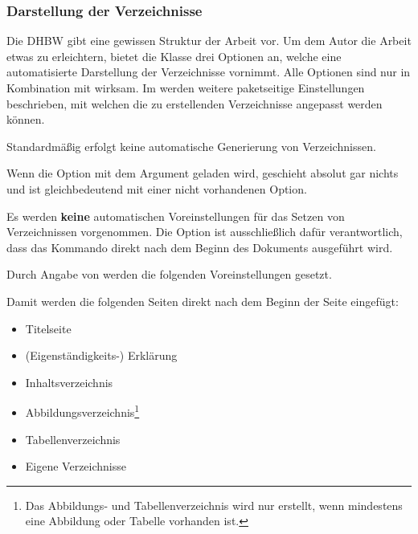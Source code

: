 \documentclass[babel=ngerman,highlight=false]{skdoc}
\begin{document}
            \subsubsection{Darstellung der Verzeichnisse}
                Die DHBW gibt eine gewissen Struktur der Arbeit vor. Um dem Autor die Arbeit etwas zu erleichtern, bietet die Klasse drei Optionen an, welche eine automatisierte Darstellung der Verzeichnisse vornimmt. Alle Optionen sind nur in Kombination mit  wirksam. Im  werden weitere paketseitige Einstellungen beschrieben, mit welchen die zu erstellenden Verzeichnisse angepasst werden können.\medskip

                Standardmäßig erfolgt keine automatische Generierung von Verzeichnissen.

                Wenn die Option mit dem Argument  geladen wird, geschieht absolut gar nichts und ist gleichbedeutend mit einer nicht vorhandenen Option.

                Es werden \textbf{keine} automatischen Voreinstellungen für das Setzen von Verzeichnissen vorgenommen. Die Option ist ausschließlich dafür verantwortlich, dass das Kommando \Macro\dhbwprintintro direkt nach dem Beginn des Dokuments ausgeführt wird.\medskip

                Durch Angabe von  werden die folgenden Voreinstellungen gesetzt.
                \begin{description}
                    \item[]
                    \item[]
                \end{description}
                Damit werden die folgenden Seiten direkt nach dem Beginn der Seite eingefügt:
                \begin{itemize}
                    \item Titelseite
                    \item (Eigenständigkeits-) Erklärung
                    \item Inhaltsverzeichnis
                    \item Abbildungsverzeichnis\footnote{\label{fn:abb}Das Abbildungs- und Tabellenverzeichnis wird nur erstellt, wenn mindestens eine Abbildung oder Tabelle vorhanden ist.}
                    \item Tabellenverzeichnis
                    \item Eigene Verzeichnisse
                \end{itemize}
\end{document}
